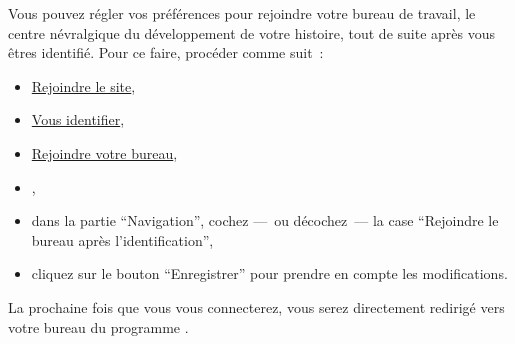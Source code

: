 Vous pouvez régler vos préférences pour rejoindre votre bureau de travail, le centre névralgique du développement de votre histoire, tout de suite après vous êtres identifié. Pour ce faire, procéder comme suit~{}:

\begin{itemize}
\item \hyperlink{rejoindre-site}{Rejoindre le site},
\item \hyperlink{vous-identifier}{Vous identifier},
\item \hyperlink{rejoindre-bureau}{Rejoindre votre bureau},
\item {},
\item dans la partie ``Navigation'', cochez —~{}ou décochez~{}— la case “Rejoindre le bureau après l'identification”,
\item cliquez sur le bouton “Enregistrer'' pour prendre en compte les modifications.
\end{itemize}

La prochaine fois que vous vous connecterez, vous serez directement redirigé vers votre bureau du programme \unan{}.

